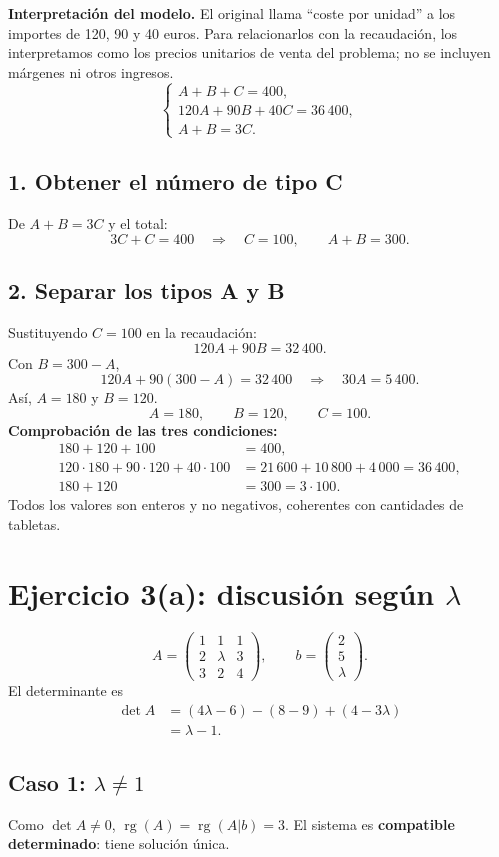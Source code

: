 \documentclass[11pt]{article}
\begin{document}
\textbf{Interpretación del modelo.} El original llama ``coste por unidad'' a los importes de 120, 90 y 40 euros. Para relacionarlos con la recaudación, los interpretamos como los precios unitarios de venta del problema; no se incluyen márgenes ni otros ingresos.
\[
\begin{cases}
A+B+C=400,\\120A+90B+40C=36\,400,\\A+B=3C.
\end{cases}
\]
\subsection*{1. Obtener el número de tipo C}
De $A+B=3C$ y el total:
\[3C+C=400\quad\Longrightarrow\quad C=100,\qquad A+B=300.\]
\subsection*{2. Separar los tipos A y B}
Sustituyendo $C=100$ en la recaudación:
\[120A+90B=32\,400.\]
Con $B=300-A$,
\[120A+90(300-A)=32\,400\quad\Longrightarrow\quad30A=5\,400.\]
Así, $A=180$ y $B=120$.
\[\boxed{A=180,\qquad B=120,\qquad C=100}.\]
\textbf{Comprobación de las tres condiciones:}
\begin{align*}
180+120+100&=400,\\
120\cdot180+90\cdot120+40\cdot100
&=21\,600+10\,800+4\,000=36\,400,\\
180+120&=300=3\cdot100.
\end{align*}
Todos los valores son enteros y no negativos, coherentes con cantidades de tabletas.
\clearpage
\section*{Ejercicio 3(a): discusión según $\lambda$}
\[
A=\begin{pmatrix}1&1&1\\2&\lambda&3\\3&2&4\end{pmatrix},\qquad
b=\begin{pmatrix}2\\5\\\lambda\end{pmatrix}.
\]
El determinante es
\begin{align*}
\det A&=(4\lambda-6)-(8-9)+(4-3\lambda)\\
&=\lambda-1.
\end{align*}
\subsection*{Caso 1: $\lambda\neq1$}
Como $\det A\neq0$, $\operatorname{rg}(A)=\operatorname{rg}(A|b)=3$. El sistema es \textbf{compatible determinado}: tiene solución única.
\end{document}
